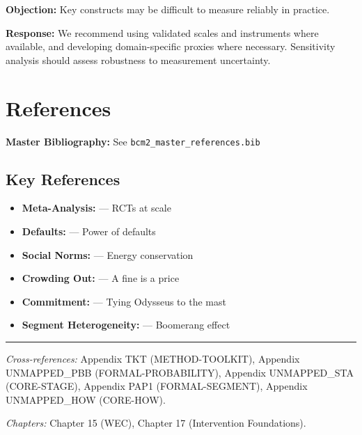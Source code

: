 \textbf{Objection:} Key constructs may be difficult to measure reliably in
practice.

\textbf{Response:} We recommend using validated scales and instruments where
available, and developing domain-specific proxies where necessary. Sensitivity
analysis should assess robustness to measurement uncertainty.


\section{References}
\label{sec:eih-references}

\begin{tcolorbox}[colback=blue!5!white, colframe=blue!75!black]
\textbf{Master Bibliography:} See \texttt{bcm2\_master\_references.bib}
\end{tcolorbox}

\subsection{Key References}

\begin{itemize}[nosep]
\item \textbf{Meta-Analysis:} \citet{dellavigna2022} --- RCTs at scale
\item \textbf{Defaults:} \citet{madrian2001} --- Power of defaults
\item \textbf{Social Norms:} \citet{allcott2011} --- Energy conservation
\item \textbf{Crowding Out:} \citet{gneezy2000} --- A fine is a price
\item \textbf{Commitment:} \citet{ashraf2006} --- Tying Odysseus to the mast
\item \textbf{Segment Heterogeneity:} \citet{schultz2007} --- Boomerang effect
\end{itemize}

\nocite{bcm_master}



\vspace{1em}
\hrule
\vspace{0.5em}

\noindent\textit{Cross-references:}
Appendix TKT (METHOD-TOOLKIT),
Appendix UNMAPPED_PBB (FORMAL-PROBABILITY),
Appendix UNMAPPED_STA (CORE-STAGE),
Appendix PAP1 (FORMAL-SEGMENT),
Appendix UNMAPPED_HOW (CORE-HOW).

\noindent\textit{Chapters:} Chapter 15 (WEC), Chapter 17 (Intervention Foundations).



